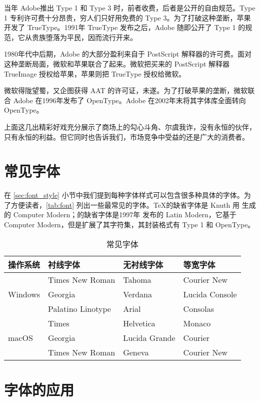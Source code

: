 当年 Adobe\indexAdobe{}推出 Type 1 和 Type 3 时，前者收费，后者是公开的自由规范。Type 1 专利许可费十分昂贵，穷人们只好用免费的 Type 3。为了打破这种垄断，苹果开发了 TrueType。1991年 TrueType 发布之后，Adobe 随即公开了 Type 1 的规范，它从贵族堕落为平民，因而流行开来。

1980年代中后期，Adobe 的大部分盈利来自于 PostScript 解释器的许可费。面对这种垄断局面，微软和苹果联合了起来。微软把买来的 PostScript 解释器 TrueImage 授权给苹果，苹果则把 TrueType 授权给微软。

微软得陇望蜀，又企图获得 AAT 的许可证，未遂。为了打破苹果的垄断，微软联合 Adobe 在1996年发布了 OpenType。Adobe 在2002年末将其字体库全面转向 OpenType。

上面这几出精彩好戏充分展示了商场上的勾心斗角、尔虞我诈，没有永恒的伙伴，只有永恒的利益。但它同时也告诉我们，市场竞争中受益的还是广大的消费者。

\section{常见字体}

在 \ref{sec:font_style} 小节中我们提到每种字体样式可以包含很多种具体的字体。为了方便读者，\autoref{tab:font} 列出一些最常见的字体。\TeX 的缺省字体是 Knuth 用 \MF 生成的 Computer Modern；\XeTeX 的缺省字体是1997年 \AmS 发布的 Latin Modern，它基于 Computer Modern，但是扩展了其字符集，其封装格式有 Type 1 和 OpenType。

\begin{table}[htbp]
\caption{常见字体}
\label{tab:font}
\centering
\begin{tabular}{llll}
  \toprule
  操作系统 & 衬线字体        & 无衬线字体 & 等宽字体 \\
  \midrule
  \multirow{3}{*}{Windows}
    & Times New Roman & Tahoma     & Courier New \\
    & Georgia         & Verdana    & Lucida Console \\
    & Palatino Linotype & Arial    & Consolas \\
  \midrule
  \multirow{3}{*}{macOS}
    & Times           & Helvetica  & Monaco \\
    & Georgia         & Lucida Grande & Courier \\
    & Times New Roman & Geneva     & Courier New \\
  \bottomrule
\end{tabular}
\end{table}

\section{字体的应用}

